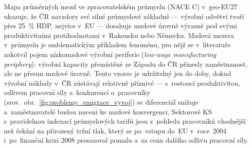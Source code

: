 Mapa průměrných mezd ve zpracovatelském průmyslu (\ac{NACE} C) v~\acs{geo-EU27} ukazuje, že \ac{ČR} navzdory své silné průmyslové základně --- výrobní odvětví tvoří přes \SI{25}{\percent} \ac{HDP}, nejvíce v~\ac{EU} --- dosahuje mzdové úrovně výrazně pod svými produktivitními protihodnotami v~Rakousku nebo Německu.
Mzdová mezera v~průmyslu je emblematickým příkladem fenoménu, pro nějž se v~literatuře zakotvil pojem nízkomzdové výrobní periferie (\emph{low-wage manufacturing periphery}): výrobní kapacity přemístěné ze Západu do ČR přinesly zaměstnanost, ale ne přesun mzdové úrovně.
Tento vzorec je udržitelný jen do doby, dokud výrobní náklady v~ČR zůstávají relativně příznivé --- s~rostoucí produktivitou, odlivem pracovní síly a~konkurencí o~pracovníky (srov.~obr.~\ref{fig:problemy_emigrace_vyvoj}) se diferenciál snižuje a~zaměstnavatelé budou nuceni ke mzdové konvergenci.
Sektorové \ac{KS} s~pravidelnou indexací průmyslových tarifů jsou z~pohledu pracovníků vhodnější než čekání na přirozený tržní tlak, který se po~vstupu do~\acs{EU} v~roce~2004 i~po~finanční krizi 2008 prosazoval pomalu a~za cenu dalšího odlivu pracovní síly.


